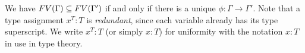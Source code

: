 \begin{definition}
\begin{enumerate}
%
%

\end{enumerate}
\end{definition}

We have ${{\relax FV}}(\Gamma) \subseteq {{\relax FV}}(\Gamma')$ if and only if 
there is a unique $\phi:\Gamma \rightarrow \Gamma'$. 
Note that a type assignment $x^T:T$ is \emph{redundant},
since each variable already has its type superscript.
We write $x^T:T$ (or simply $x:T$)
for uniformity with the notation $x:T$ in use in type theory.







